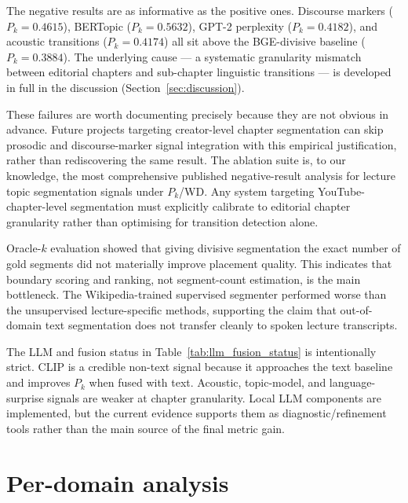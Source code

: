 The negative results are as informative as the positive ones.
Discourse markers ($P_k=0.4615$), BERTopic ($P_k=0.5632$), GPT-2 perplexity
($P_k=0.4182$), and acoustic transitions ($P_k=0.4174$) all sit above the
BGE-divisive baseline ($P_k=0.3884$). The underlying cause --- a systematic
granularity mismatch between editorial chapters and sub-chapter linguistic
transitions --- is developed in full in the discussion
(Section~\ref{sec:discussion}).

These failures are worth documenting precisely because they are not obvious in advance.
Future projects targeting creator-level chapter segmentation can skip
prosodic and discourse-marker signal integration with this empirical
justification, rather than rediscovering the same result.
The \lecseg{} ablation suite is, to our knowledge, the most comprehensive
published negative-result analysis for lecture topic segmentation signals
under $P_k$/WD.
Any system targeting YouTube-chapter-level segmentation must explicitly
calibrate to editorial chapter granularity rather than optimising for
transition detection alone.

Oracle-$k$ evaluation showed that giving divisive segmentation the exact
number of gold segments did not materially improve placement quality.
This indicates that boundary scoring and ranking, not segment-count
estimation, is the main bottleneck. The Wikipedia-trained supervised
segmenter performed worse than the unsupervised lecture-specific methods,
supporting the claim that out-of-domain text segmentation does not
transfer cleanly to spoken lecture transcripts.

The LLM and fusion status in Table~\ref{tab:llm_fusion_status} is intentionally
strict. CLIP is a credible non-text signal because it approaches the text
baseline and improves $P_k$ when fused with text. Acoustic, topic-model, and
language-surprise signals are weaker at chapter granularity. Local LLM
components are implemented, but the current evidence supports them as
diagnostic/refinement tools rather than the main source of the final metric
gain.

\section{Per-domain analysis}
\label{sec:domain}

